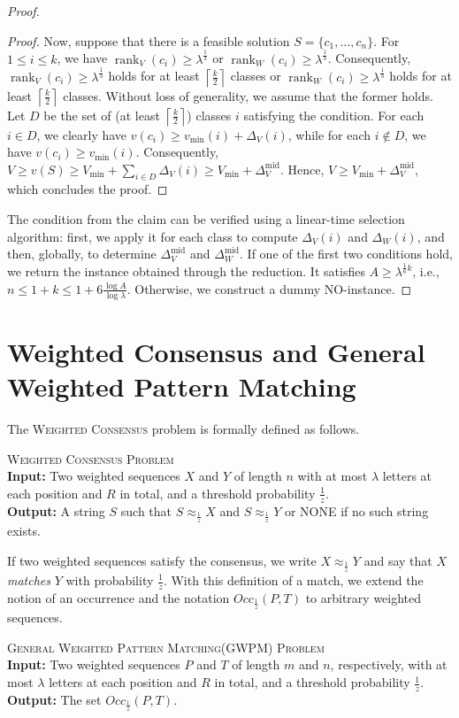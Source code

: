 \documentclass{article}
\theoremstyle{plain}
\theoremstyle{definition}
\newenvironment{dsproblem}[1]
{\begin{center}\begin{lrbox}{\mybox}\begin{minipage}{0.96\columnwidth}#1 \textsc{Problem}\\}
{\end{minipage}\end{lrbox}\fbox{\usebox{\mybox}}\end{center}}
\newcommand{\defdsproblem}[3]{
  \begin{dsproblem}{#1}
\textbf{Input:} #2\\
\textbf{Output:} #3
  \end{dsproblem}
  }
\newcommand{\GWPM}{\textsc{GWPM}\xspace}
\newcommand{\GWPMFull}{\textsc{General Weighted Pattern Matching}\xspace}
\newcommand{\WC}{\textsc{Weighted Consensus}\xspace}
\newcommand{\ceil}[1]{\left\lceil #1 \right\rceil}
\newcommand{\Occ}{\mathit{Occ}}
\newcommand{\fr}{\ensuremath{\frac1z}}
\newcommand{\match}{\approx_{\frac1z}}
\newcommand{\mmid}{\mathrm{mid}}
\DeclareMathOperator*{\rank}{rank}
\begin{document}
\begin{proof}
\begin{proof}
    Now, suppose that there is a feasible solution $S=\{c_1,\ldots,c_n\}$. For $1\le i \le k$, we have $\rank_V(c_i)\ge \lambda^{\frac13}$
    or $\rank_W(c_i) \ge \lambda^{\frac13}$. Consequently, $\rank_V(c_i)\ge \lambda^{\frac13}$ holds for at least $\ceil{\frac{k}{2}}$
    classes or $\rank_W(c_i)\ge \lambda^{\frac13}$ holds for at least $\ceil{\frac{k}{2}}$ classes.
    Without loss of generality, we assume that the former holds. Let $D$ be the set of (at least $\ceil{\frac{k}{2}}$) classes $i$ satisfying the condition.
    For each $i\in D$, we clearly have $v(c_i)\ge v_{\min}(i)+\Delta_V(i)$, while for each $i\notin D$, we have $v(c_i)\ge v_{\min}(i)$.
    Consequently, $V\ge v(S) \ge V_{\min} + \sum_{i\in D} \Delta_V(i) \ge V_{\min} + \Delta_V^{\mmid}$.
    Hence, $V \ge V_{\min} + \Delta_V^{\mmid}$, which concludes the proof.
    \end{proof}
       
    The condition from the claim can be verified using a linear-time selection algorithm: 
    first, we apply it for each class to compute $\Delta_V(i)$ and $\Delta_W(i)$, 
    and then, globally, to determine $\Delta_V^{\mmid}$ and $\Delta_W^{\mmid}$.
    If one of the first two conditions hold, we return the instance obtained through the reduction.
    It satisfies $A \ge \lambda^{\frac 16 k}$, i.e., $n \le 1+k \le 1+6\frac{\log A}{\log \lambda}$.
    Otherwise, we construct a dummy NO-instance.
    \end{proof}

  
 

  \section{Weighted Consensus and General Weighted Pattern Matching}\label{sec:GWPMReduction}
    The \WC problem is formally defined as follows.
    \defdsproblem{\WC}{
      Two weighted sequences $X$ and $Y$ of length $n$ with at most $\lambda$ letters at each position and $R$ in total,
      and a threshold probability \fr.
    }{
      A string $S$ such that $S \match X$ and $S \match Y$ or NONE if no such string exists.
    }

    If two weighted sequences satisfy the consensus, we write $X \match Y$ and say that $X$ \emph{matches} $Y$
    with probability \fr.
    With this definition of a match, we extend the notion of an occurrence and the notation $\Occ_\fr(P,T)$ to arbitrary weighted sequences.

    \defdsproblem{\GWPMFull (\GWPM)}{
      Two weighted sequences $P$ and $T$ of length $m$ and $n$, respectively, with at most $\lambda$ letters at each position
      and $R$ in total, and a threshold probability \fr.
    }{
      The set $\Occ_\fr(P,T)$.
    }
\end{document}
